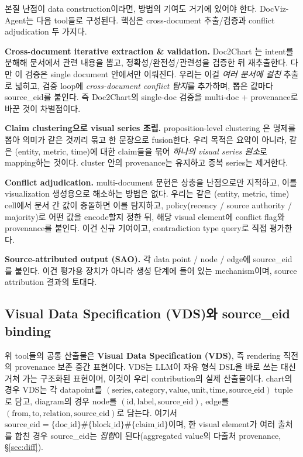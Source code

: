 \documentclass[11pt]{article}
\begin{document}
본질 난점이 data construction이라면, 방법의 기여도 거기에 있어야 한다. DocViz-Agent는
다음 tool들로 구성된다. 핵심은 cross-document 추출/검증과 conflict adjudication 두 가지다.

\textbf{Cross-document iterative extraction \& validation.} Doc2Chart \cite{jain2025doc2chart}는
intent를 분해해 문서에서 관련 내용을 뽑고, 정확성/완전성/관련성을 검증한 뒤 재추출한다. 다만
이 검증은 single document 안에서만 이뤄진다. 우리는 이걸 \emph{여러 문서에 걸친} 추출로 넓히고,
검증 loop에 \emph{cross-document conflict 탐지}를 추가하며, 뽑은 값마다 source\_eid를 붙인다.
즉 Doc2Chart의 single-doc 검증을 multi-doc + provenance로 바꾼 것이 차별점이다.

\textbf{Claim clustering으로 visual series 조립.} proposition-level clustering
\cite{ernst2022proposition}은 명제를 뽑아 의미가 같은 것끼리 묶고 한 문장으로 fusion한다.
우리 목적은 요약이 아니라, 같은 (entity, metric, time)에 대한 claim들을 묶어 \emph{하나의
visual series 원소}로 mapping하는 것이다. cluster 안의 provenance는 유지하고 중복 series는
제거한다.

\textbf{Conflict adjudication.} multi-document 문헌은 상충을 난점으로만 지적하고, 이를
visualization 생성용으로 해소하는 방법은 없다. 우리는 같은 (entity, metric, time) cell에서
문서 간 값이 충돌하면 이를 탐지하고, policy(recency / source authority / majority)로 어떤 값을
encode할지 정한 뒤, 해당 visual element에 conflict flag와 provenance를 붙인다. 이건 신규
기여이고, contradiction type query로 직접 평가한다.

\textbf{Source-attributed output (SAO).} 각 data point / node / edge에 source\_eid를 붙인다.
이건 평가용 장치가 아니라 생성 단계에 들어 있는 mechanism이며, source attribution 결과의 토대다.

\subsection{Visual Data Specification (VDS)와 source\_eid binding}
\label{sec:vds}

위 tool들의 공통 산출물은 \textbf{Visual Data Specification (VDS)}, 즉 rendering 직전의
provenance 보존 중간 표현이다. VDS는 LLM이 자유 형식 DSL을 바로 쓰는 대신 거쳐 가는 구조화된
표현이며, 이것이 우리 contribution의 실제 산출물이다. chart의 경우 VDS는 각 datapoint를
$(\text{series}, \text{category}, \text{value}, \text{unit}, \text{time}, \text{source\_eid})$
tuple로 담고, diagram의 경우 node를 $(\text{id}, \text{label}, \text{source\_eid})$, edge를
$(\text{from}, \text{to}, \text{relation}, \text{source\_eid})$로 담는다. 여기서
$\text{source\_eid} = \{\text{doc\_id}\}\#\{\text{block\_id}\}\#\{\text{claim\_id}\}$이며, 한
visual element가 여러 출처를 합친 경우 source\_eid는 \emph{집합}이 된다(aggregated value의
다출처 provenance, \S\ref{sec:diff}).
\end{document}
